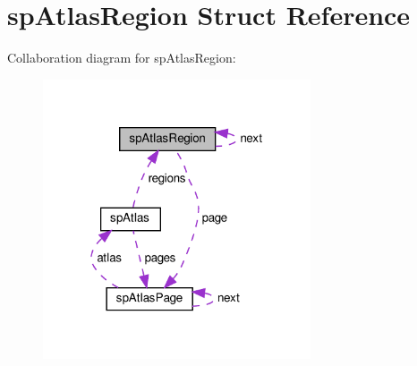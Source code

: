 \hypertarget{structspAtlasRegion}{}\section{sp\+Atlas\+Region Struct Reference}
\label{structspAtlasRegion}


Collaboration diagram for sp\+Atlas\+Region\+:
\nopagebreak
\begin{figure}[H]
\begin{center}
\leavevmode
\includegraphics[width=224pt]{structspAtlasRegion__coll__graph}
\end{center}
\end{figure}
